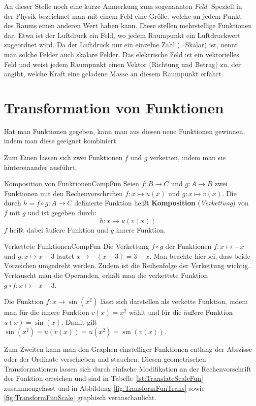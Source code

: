 An dieser Stelle noch eine kurze Anmerkung zum sogenannten \emph{Feld}. Speziell in der Physik bezeichnet man mit einem Feld eine Größe, welche an jedem Punkt des Raums einen anderen Wert haben kann. Diese stellen mehrstellige Funktionen dar. Etwa ist der Luftdruck ein Feld, wo jedem Raumpunkt ein Luftdruckwert zugeordnet wird. Da der Luftdruck nur ein einzelne Zahl (=Skalar) ist, nennt man solche Felder auch skalare Felder. Das elektrische Feld ist ein vektorielles Feld und weist jedem Raumpunkt einen Vektor (Richtung und Betrag) zu, der angibt, welche Kraft eine geladene Masse an diesem Raumpunkt erfährt.

\section{Transformation von Funktionen}

Hat man Funktionen gegeben, kann man aus diesen neue Funktionen gewinnen, indem man diese geeignet kombiniert.

Zum Einen lassen sich zwei Funktionen $f$ und $g$ verketten, indem man sie hintereinander ausführt.

\begin{definition}{Komposition von Funktionen}{CompFun}
    Seien $f: B \to C$ und $g: A \to B$ zwei Funktionen mit den Rechenvorschriften $f: x \mapsto u(x)$ und $g: x \mapsto v(x)$. Die durch $h = f \circ g: A \to C$ definierte Funktion heißt \textbf{Komposition} (\emph{Verkettung}) von $f$ mit $g$ und ist gegeben durch:
    $$
        h: x \mapsto u(v(x))
    $$
    $f$ heißt dabei äußere Funktion und $g$ innere Funktion.
\end{definition}

\begin{example}{Verkettete Funktionen}{CompFun}
    Die Verkettung $f \circ g$ der Funktionen $f: x \mapsto -x$ und $g: x \mapsto x-3$ lautet $x \mapsto -(x-3) = 3-x$. Man beachte hierbei, dass beide Vorzeichen umgedreht werden. Zudem ist die Reihenfolge der Verkettung wichtig. Vertauscht man die Operanden, erhält man die verkettete Funktion $g \circ f: x \mapsto -x-3$.

    Die Funktion $f: x \to \sin(x^2)$ lässt sich darstellen als verkette Funktion, indem man für die innere Funktion $v(x) = x^2$ wählt und für die äußere Funktion $u(x) = \sin(x)$. Damit gilt $\sin(x^2) = u(v(x)) = u(x^2) = \sin(v(x))$.
\end{example}

Zum Zweiten kann man den Graphen einstelliger Funktionen entlang der Abszisse oder der Ordinate verschieben und stauchen. Diesen geometrischen Transformationen lassen sich durch einfache Modifikation an der Rechenvorschrift der Funktion erreichen und sind in Tabelle  \ref{lst:TranslateScaleFun} zusammengefasst und in Abbildung \ref{fig:TransformFunTrans} sowie \ref{fig:TransformFunScale} graphisch veranschaulicht.

